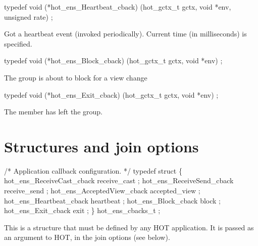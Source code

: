 \documentclass[11pt]{article}
\begin{document}
\begin{codebox}
typedef void (*hot_ens_Heartbeat_cback)
    (hot_gctx_t gctx, void *env, unsigned rate) ;
\end{codebox}
Got a heartbeat event (invoked periodically).  Current time (in
milliseconds) is specified.

\begin{codebox}
typedef void (*hot_ens_Block_cback)
  (hot_gctx_t gctx, void *env) ;
\end{codebox}
The group is about to block for a view change 

\begin{codebox}
typedef void (*hot_ens_Exit_cback)
  (hot_gctx_t gctx, void *env) ;
\end{codebox}
The member has left the group.

\section{Structures and join options}
\begin{codebox}
/* Application callback configuration.
 */
typedef struct \{
  hot_ens_ReceiveCast_cback receive_cast ;
  hot_ens_ReceiveSend_cback receive_send ;
  hot_ens_AcceptedView_cback accepted_view ;
  hot_ens_Heartbeat_cback heartbeat ;
  hot_ens_Block_cback block ;
  hot_ens_Exit_cback exit ;
\} hot_ens_cbacks_t ;
\end{codebox}
This is a structure that must be defined by any HOT application. It
is passed as an argument to HOT, in the join options (see below).
\end{document}
